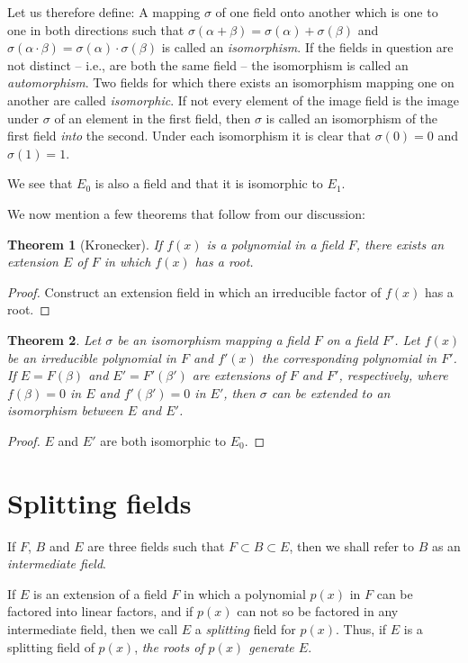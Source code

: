 \documentclass[10pt,leqno,a5paper]{book}
\newtheorem{theo}{Theorem}
\theoremstyle{definition}
\let\htw\section
\begin{document}
Let us therefore define:
A mapping $\sigma$ of one field onto another which is one to one in both directions such that $\sigma(\alpha + \beta) = \sigma(\alpha) + \sigma(\beta)$ and $\sigma(\alpha \cdot \beta) = \sigma(\alpha) \cdot \sigma(\beta)$ is called an \emph{isomorphism}.
If the fields in question are not distinct -- i.e., are both the same field -- the isomorphism is called an \emph{automorphism}.
Two fields for which there exists an isomorphism mapping one on another are called \emph{isomorphic}.
If not every element of the image field is the image under $\sigma$ of an element in the first field, then $\sigma$ is called an isomorphism of the first field \emph{into} the second.
Under each isomorphism it is clear that $\sigma(0) = 0$ and $\sigma(1) = 1$.

We see that $E_0$ is also a field and that it is isomorphic to $E_1$.

We now mention a few theorems that follow from our discussion:

\begin{theo}[Kronecker]
\label{theo:se}
If $f(x)$ is a polynomial in a field $F$, there exists an extension $E$ of $F$ in which $f(x)$ has a root.
\end{theo}

\begin{proof}
Construct an extension field in which an irreducible factor of $f(x)$ has a root.
\end{proof}

\begin{theo}
\label{theo:ei}
Let $\sigma$ be an isomorphism mapping a field $F$ on a field $F'$.
Let $f(x)$ be an irreducible polynomial in $F$ and $f'(x)$ the corresponding polynomial in $F'$.
If $E = F(\beta)$ and $E' = F'(\beta')$ are extensions of $F$ and $F'$, respectively, where $f(\beta) = 0$ in $E$ and $f'(\beta') = 0$ in $E'$, then $\sigma$ can be extended to an isomorphism between $E$ and $E'$.
\end{theo}

\begin{proof}
$E$ and $E'$ are both isomorphic to $E_0$.
\end{proof}


\htw{Splitting fields}

If $F$, $B$ and $E$ are three fields such that $F \subset B \subset E$, then we shall refer to $B$ as an \emph{intermediate field}.

If $E$ is an extension of a field $F$ in which a polynomial $p(x)$ in $F$ can be factored into linear factors, and if $p(x)$ can not so be factored in any intermediate field, then we call $E$ a \emph{splitting} field for $p(x)$.
Thus, if $E$ is a splitting field of $p(x)$, \emph{the roots of $p(x)$ generate $E$}.
\end{document}
